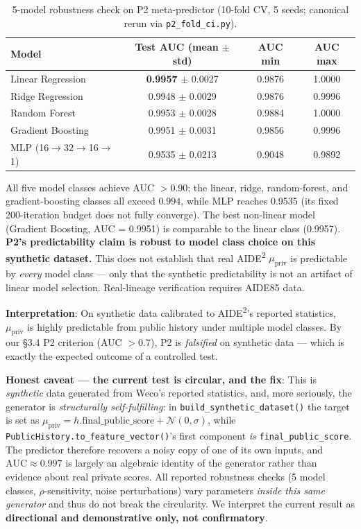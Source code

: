 \documentclass{article}
\theoremstyle{definition}
\begin{document}
\begin{table}[h]
\centering
\caption{5-model robustness check on P2 meta-predictor (10-fold CV, 5 seeds; canonical rerun via \texttt{p2\_fold\_ci.py}).}
\label{tab:p2-robust}
\begin{tabular}{lccc}
\toprule
Model & Test AUC (mean $\pm$ std) & AUC min & AUC max \\
\midrule
Linear Regression & \textbf{0.9957} $\pm$ 0.0027 & 0.9876 & 1.0000 \\
Ridge Regression & 0.9948 $\pm$ 0.0029 & 0.9876 & 0.9996 \\
Random Forest & 0.9953 $\pm$ 0.0028 & 0.9884 & 1.0000 \\
Gradient Boosting & 0.9951 $\pm$ 0.0031 & 0.9856 & 0.9996 \\
MLP (16$\to$32$\to$16$\to$1) & 0.9535 $\pm$ 0.0213 & 0.9048 & 0.9892 \\
\bottomrule
\end{tabular}
\end{table}

All five model classes achieve AUC $> 0.90$; the linear, ridge, random-forest, and gradient-boosting classes all exceed $0.994$, while MLP reaches 0.9535 (its fixed 200-iteration budget does not fully converge). The best non-linear model (Gradient Boosting, AUC = 0.9951) is comparable to the linear class (0.9957). \textbf{P2's predictability claim is robust to model class choice on this synthetic dataset.} This does not establish that real AIDE\textsuperscript{2} $\mu_{\text{priv}}$ is predictable by \emph{every} model class --- only that the synthetic predictability is not an artifact of linear model selection. Real-lineage verification requires AIDE85 data.

\textbf{Interpretation}: On synthetic data calibrated to AIDE\textsuperscript{2}'s reported statistics, $\mu_{\text{priv}}$ is highly predictable from public history under multiple model classes. By our \S3.4 P2 criterion (AUC $> 0.7$), P2 is \emph{falsified} on synthetic data --- which is exactly the expected outcome of a controlled test.

\textbf{Honest caveat — the current test is circular, and the fix}: This is \emph{synthetic} data generated from Weco's reported statistics, and, more seriously, the generator is \emph{structurally self-fulfilling}: in \texttt{build\_synthetic\_dataset()} the target is set as $\mu_{\text{priv}} = h.\text{final\_public\_score} + \mathcal{N}(0,\sigma)$, while \texttt{PublicHistory.to\_feature\_vector()}'s first component \emph{is} \texttt{final\_public\_score}. The predictor therefore recovers a noisy copy of one of its own inputs, and $\text{AUC}\approx0.997$ is largely an algebraic identity of the generator rather than evidence about real private scores. All reported robustness checks (5 model classes, $\rho$-sensitivity, noise perturbations) vary parameters \emph{inside this same generator} and thus do not break the circularity. We interpret the current result as \textbf{directional and demonstrative only, not confirmatory}.
\end{document}
